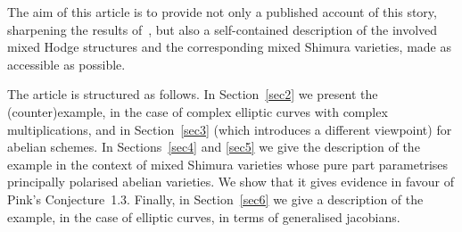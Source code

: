 \documentclass[11pt]{article}
\theoremstyle{plain}
\theoremstyle{definition}
\numberwithin{equation}{subsection}
\begin{document}
The aim of this article is to provide not only a published account of
this story, sharpening the results of~\cite{Bertrand11}, but also a
self-contained description of the involved mixed Hodge structures and
the corresponding mixed Shimura varieties, made as accessible as
possible.

The article is structured as follows. In Section~\ref{sec2} we present
the (counter)example, in the case of complex elliptic curves with
complex multiplications, and in Section~\ref{sec3} (which introduces a
different viewpoint) for abelian schemes. In Sections~\ref{sec4} and
\ref{sec5} we give the description of the example in the context of
mixed Shimura varieties whose pure part parametrises principally
polarised abelian varieties. We show that it gives evidence in favour of
Pink's Conjecture~1.3. Finally, in Section~\ref{sec6} we give a description
of the example, in the case of elliptic curves, in terms of
generalised jacobians.
\end{document}
